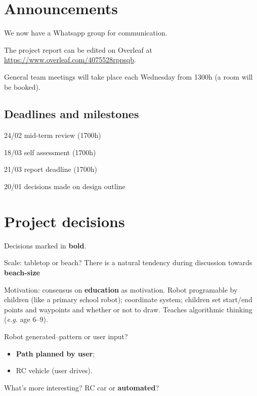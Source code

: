 



\maketitle

\section{Announcements}
\begin{hiddenitems}
    \item We now have a Whatsapp group for communication.
    \item The project report can be edited on Overleaf at \url{https://www.overleaf.com/4075528rppsqb}.
    \item General team meetings will take place each Wednesday from 1300h (a room will be booked).
\end{hiddenitems}
\subsection{Deadlines and milestones}
\begin{items}
    \item 24/02 mid-term review (1700h)
    \item 18/03 self assessment (1700h)
    \item 21/03 report deadline (1700h)
    \item 20/01 decisions made on design outline
\end{items}

\section{Project decisions}
Decisions marked in \textbf{bold}.
\begin{items}
    \item Scale: tabletop or beach? There is a natural tendency during discussion towards \textbf{beach-size}
    \item Motivation: consensus on \textbf{education} as motivation. Robot programable by children (like a primary school robot); coordinate system; children set start/end points and waypoints and whether or not to draw. Teaches algorithmic thinking (\emph{e.g.} age 6--9).
    \item Robot generated--pattern or user input?
    \begin{itemize}
        \item \textbf{Path planned by user};
        \item RC vehicle (user drives).
    \end{itemize}
    What's more interesting? RC car or \textbf{automated}?
\end{items}

